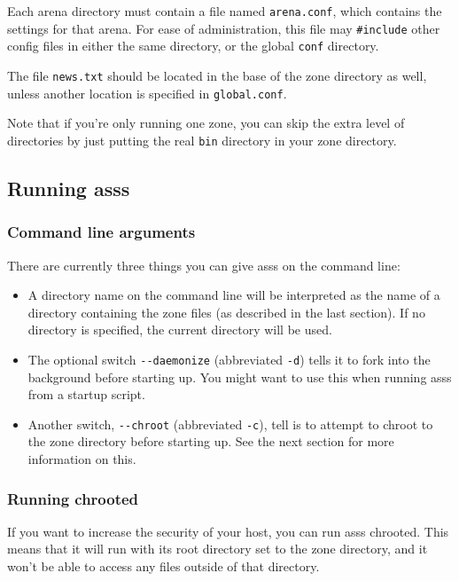 \documentclass{article}
\newcommand{\asss}{asss}
\begin{document}
Each arena directory must contain a file named \verb/arena.conf/, which
contains the settings for that arena. For ease of administration, this
file may \verb/#include/ other config files in either the same
directory, or the global \verb/conf/ directory.

The file \verb/news.txt/ should be located in the base of the zone
directory as well, unless another location is specified in
\verb/global.conf/.

Note that if you're only running one zone, you can skip the extra level
of directories by just putting the real \verb/bin/ directory in your
zone directory.


\subsection{Running \asss{}}

\subsubsection{Command line arguments}

There are currently three things you can give \asss{} on the command
line:

\begin{itemize}

\item A directory name on the command line will be interpreted as the
name of a directory containing the zone files (as described in the last
section). If no directory is specified, the current directory will be
used.

\item The optional switch \verb/--daemonize/ (abbreviated \verb/-d/)
tells it to fork into the background before starting up. You might want
to use this when running \asss{} from a startup script.

\item Another switch, \verb/--chroot/ (abbreviated \verb/-c/), tell is
to attempt to chroot to the zone directory before starting up. See the
next section for more information on this.

\end{itemize}

\subsubsection{Running chrooted}

If you want to increase the security of your host, you can run \asss{}
chrooted. This means that it will run with its root directory set to the
zone directory, and it won't be able to access any files outside of that
directory.
\end{document}
